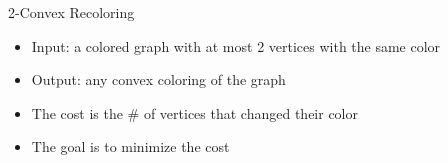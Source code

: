 \begin{frame}{2-Convex Recoloring}
\begin{itemize}


\item
Input: a colored graph with at most 2 vertices with the same color

\pause\item
Output: any convex coloring of the graph

\pause\item
The cost is the \# of vertices that changed their color

\pause\item
The goal is to minimize the cost


\end{itemize}
\pause
\end{frame}
